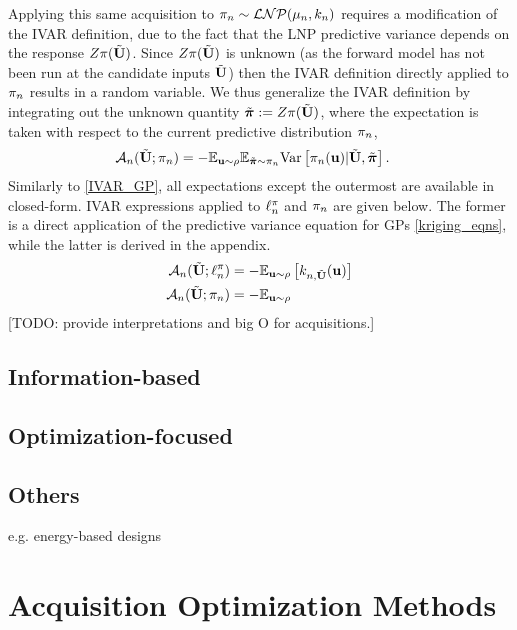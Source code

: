 \documentclass[12pt]{article}
\begin{document}
Applying this same acquisition 
to $\unPostPred \sim \LNP(\logUnPostMeanPred, \logUnPostKerPred)$ requires a modification of the IVAR definition, due to the fact that the LNP predictive 
variance depends on the response $Z\postDens(\batchMat)$. Since $Z\postDens(\batchMat)$ is unknown (as the forward model has not been run at the candidate 
inputs $\batchMat$) then the IVAR definition \label{IVAR_GP} directly applied to $\unPostPred$ results in a random variable.
We thus generalize the IVAR definition by integrating out the unknown quantity $\tilde{\boldsymbol{\postDens}} := Z \postDens(\batchMat)$, where the expectation is taken with respect to the current predictive distribution $\unPostPred$,
\begin{align}
\acq[\designIdx](\batchMat; \unPostPred) &= -\E_{\bpar \sim \rho} \E_{\tilde{\boldsymbol{\postDens}}  \sim \unPostPred} \Var\left[\unPostPred(\bpar) | \batchMat, \tilde{\boldsymbol{\postDens}}  \right]. \label{IVAR_LNP}
\end{align}
Similarly to \ref{IVAR_GP}, all expectations except the outermost are available in closed-form. IVAR expressions applied to $\logUnPostPred$ and 
$\unPostPred$ are given below. The former is a direct application of the predictive variance equation for GPs \ref{kriging_eqns}, while the latter is 
derived in the appendix. 
\begin{align}
\acq[\designIdx](\batchMat; \logUnPostPred) &= -\E_{\bpar \sim \rho}  \left[\logUnPostKerPred[\designIdx, \batchMat](\bpar)\right] \label{IVAR_GP_derivation} \\
\acq[\designIdx](\batchMat; \unPostPred) &= -\E_{\bpar \sim \rho} \label{IVAR_LNP_derivation}
\end{align}
[TODO: provide interpretations and big O for acquisitions.]

\subsection{Information-based}
\subsection{Optimization-focused}
\subsection{Others}
e.g. energy-based designs 

\section{Acquisition Optimization Methods}
\end{document}
